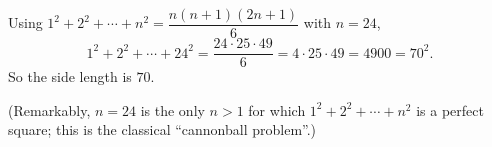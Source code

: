 Using $1^2+2^2+\cdots+n^2=\dfrac{n(n+1)(2n+1)}{6}$ with $n=24$,
\[1^2+2^2+\cdots+24^2=\dfrac{24\cdot25\cdot49}{6}=4\cdot25\cdot49=4900=70^2 .\]
So the side length is $\boxed{70}$.

(Remarkably, $n=24$ is the only $n>1$ for which $1^2+2^2+\cdots+n^2$ is a perfect square; this is the classical ``cannonball problem''.)
